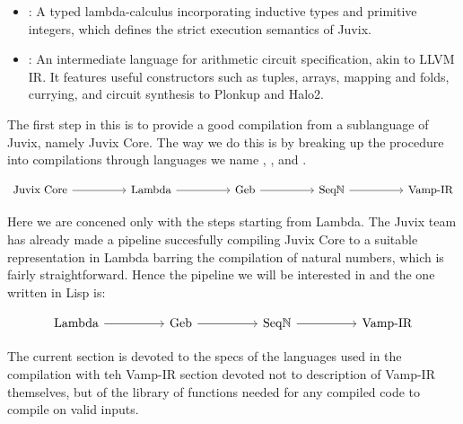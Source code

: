 \begin{itemize}
  \item \JuvixCore{}: A typed lambda-calculus incorporating inductive
  types and primitive integers, which defines the strict execution
  semantics of Juvix.
  \item \VampIR{}: An intermediate language for arithmetic circuit
  specification, akin to LLVM IR. It features useful constructors such as
  tuples, arrays, mapping and folds, currying, and circuit synthesis to
  Plonkup and Halo2.
\end{itemize}



The first step in this is to provide a good compilation from a sublanguage of Juvix, namely Juvix Core. The way we do this is by breaking up the procedure into compilations through languages we name \LambdaIR{}, \Geb{}, and \SeqN{}.

\[\begin{tikzcd}
	{\text{Juvix Core}} && {\text{Lambda}} && {\text{Geb}} && {\text{Seq$\N$} } && {\text{Vamp-IR}}
	\arrow[from=1-3, to=1-5]
	\arrow[from=1-5, to=1-7]
	\arrow[from=1-7, to=1-9]
	\arrow[from=1-1, to=1-3]
\end{tikzcd}\]

Here we are concened only with the steps starting from Lambda. The Juvix team has already made a pipeline succesfully compiling Juvix Core to a suitable representation in Lambda barring the compilation of natural numbers, which is fairly straightforward. Hence the pipeline we will be interested in and the one written in Lisp is:

\[\begin{tikzcd}
	{\text{Lambda}} && {\text{Geb}} && {\text{Seq$\N$} } && {\text{Vamp-IR}}
	\arrow[from=1-1, to=1-3]
	\arrow[from=1-3, to=1-5]
	\arrow[from=1-5, to=1-7]
\end{tikzcd}\]

The current section is devoted to the specs of the languages used in the compilation with teh Vamp-IR section devoted not to description of Vamp-IR themselves, but of the library of functions needed for any compiled code to compile on valid inputs. 


